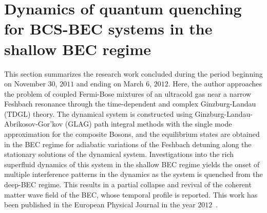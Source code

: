 \documentclass[a4paper,10pt]{report}
\begin{document}
\section{\sc  Dynamics of quantum quenching for BCS-BEC systems in the shallow BEC regime}
\label{sec:bcsbec}
This section summarizes the research work concluded during the period beginning on November $30$, $2011$ and ending on March $6$, $2012$. Here, the author approaches the problem of coupled Fermi-Bose mixtures of an ultracold gas near a narrow Feshbach resonance through the time-dependent and complex Ginzburg-Landau (TDGL) theory. The dynamical system is constructed using Ginzburg-Landau-Abrikosov-Gor'kov (GLAG) path integral methods with the single mode approximation for the composite Bosons, and the equilibrium states are obtained in the BEC regime for adiabatic variations of the Feshbach detuning along the stationary solutions of the dynamical system. Investigations into the rich superfluid dynamics of this system in the shallow BEC regime yields the onset of multiple interference patterns in the dynamics as the system is quenched from the deep-BEC regime. This results in a partial collapse and revival of the coherent matter wave field of the BEC, whose temporal profile is reported. This work has been 
published in the European Physical Journal in the year $2012$~\cite{mypaper1}.
\end{document}
